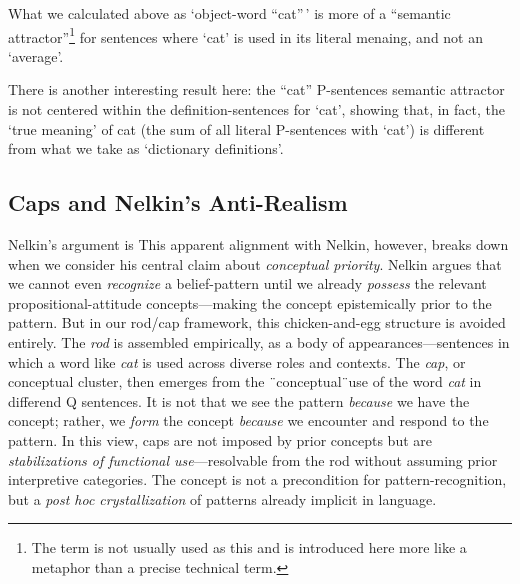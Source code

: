 \documentclass[12pt]{article}
\begin{document}
What we calculated above as `object-word ``cat''\,' is more of a ``semantic attractor''\footnote{The term is not usually used as this and is introduced here more like a metaphor than a precise technical term.} for sentences where `cat' is used in its literal menaing, and not an `average'.

There is another interesting result here: the ``cat'' P-sentences semantic attractor is not centered within the definition-sentences for `cat', showing that, in fact, the `true meaning' of cat (the sum of all literal P-sentences with `cat') is different from what we take as `dictionary definitions'.

\subsection{Caps and Nelkin's Anti-Realism}\label{caps-and-nelkins-anti-realism}

Nelkin's argument is This apparent alignment with Nelkin, however, breaks down when we consider his central claim about \emph{conceptual priority}. Nelkin argues that we cannot even \emph{recognize} a belief-pattern until we already \emph{possess} the relevant propositional-attitude concepts---making the concept epistemically prior to the pattern. But in our rod/cap framework, this chicken-and-egg structure is avoided entirely. The \emph{rod} is assembled empirically, as a body of appearances---sentences in which a word like \emph{cat} is used across diverse roles and contexts. The \emph{cap}, or conceptual cluster, then emerges from the ¨conceptual¨use of the word \emph{cat} in differend Q sentences. It is not that we see the pattern \emph{because} we have the concept; rather, we \emph{form} the concept \emph{because} we encounter and respond to the pattern. In this view, caps are not imposed by prior concepts but are \emph{stabilizations of functional use}---resolvable from the rod without assuming prior interpretive categories. The concept is not a precondition for pattern-recognition, but a \emph{post hoc crystallization} of patterns already implicit in language.
\end{document}
